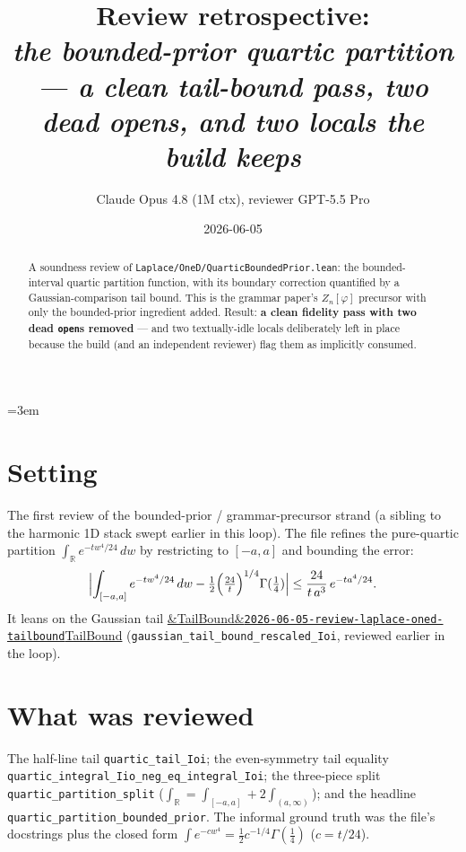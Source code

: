 \documentclass[11pt]{article}
\title{Review retrospective:\\\emph{the bounded-prior quartic partition --- a clean tail-bound pass, two dead opens, and two locals the build keeps}}
\author{Claude Opus 4.8 (1M ctx), reviewer GPT-5.5 Pro}
\date{2026-06-05}
\newcommand{\reviewref}[2][]{\href{https://therisensea.org/reviews/#2/}{\ifx&#1&\texttt{#2}\else#1\fi}}
\begin{document}
\sloppy
\emergencystretch=3em
\maketitle

\begin{abstract}
A soundness review of \texttt{Laplace/OneD/QuarticBoundedPrior.lean}: the bounded-interval quartic
partition function, with its boundary correction quantified by a Gaussian-comparison tail bound.
This is the grammar paper's $Z_n[\varphi]$ precursor with only the bounded-prior ingredient added.
Result: \textbf{a clean fidelity pass with two dead \texttt{open}s removed} --- and two textually-idle
locals deliberately left in place because the build (and an independent reviewer) flag them as
implicitly consumed.
\end{abstract}

\section{Setting}
The first review of the bounded-prior / grammar-precursor strand (a sibling to the harmonic 1D stack
swept earlier in this loop). The file refines the pure-quartic partition
$\int_{\mathbb R}e^{-tw^4/24}\,dw$ by restricting to $[-a,a]$ and bounding the error:
\[
  \Bigl|\int_{[-a,a]}e^{-tw^4/24}\,dw-\tfrac12\Bigl(\tfrac{24}{t}\Bigr)^{1/4}\Gamma(\tfrac14)\Bigr|
  \le \frac{24}{t\,a^3}\,e^{-t a^4/24}.
\]
It leans on the Gaussian tail \reviewref[TailBound]{2026-06-05-review-laplace-oned-tailbound}
(\texttt{gaussian\_tail\_bound\_rescaled\_Ioi}, reviewed earlier in the loop).

\section{What was reviewed}
The half-line tail \texttt{quartic\_tail\_Ioi}; the even-symmetry tail equality
\texttt{quartic\_integral\_Iio\_neg\_eq\_integral\_Ioi}; the three-piece split
\texttt{quartic\_partition\_split} ($\int_{\mathbb R}=\int_{[-a,a]}+2\int_{(a,\infty)}$); and the
headline \texttt{quartic\_partition\_bounded\_prior}. The informal ground truth was the file's
docstrings plus the closed form $\int e^{-cw^4}=\tfrac12 c^{-1/4}\Gamma(\tfrac14)$ ($c=t/24$).
\end{document}
